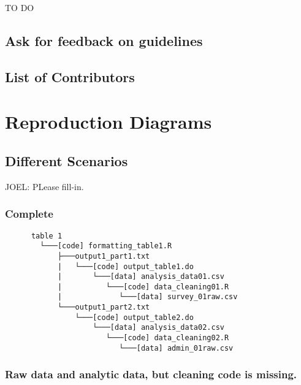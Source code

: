 \documentclass[]{book}
\begin{document}
TO DO

\hypertarget{ask-for-feedback-on-guidelines}{%
\section{Ask for feedback on guidelines}\label{ask-for-feedback-on-guidelines}}

\hypertarget{list-of-contributors}{%
\section{List of Contributors}\label{list-of-contributors}}

\hypertarget{reproduction-diagrams}{%
\chapter{Reproduction Diagrams}\label{reproduction-diagrams}}

\hypertarget{different-scenarios}{%
\section{Different Scenarios}\label{different-scenarios}}

JOEL: PLease fill-in.

\hypertarget{complete}{%
\subsection{Complete}\label{complete}}

\begin{verbatim}
      table 1
        └───[code] formatting_table1.R
            ├───output1_part1.txt  
            |   └───[code] output_table1.do           
            |       └───[data] analysis_data01.csv
            |          └───[code] data_cleaning01.R
            |             └───[data] survey_01raw.csv
            └───output1_part2.txt  
                └───[code] output_table2.do           
                    └───[data] analysis_data02.csv
                       └───[code] data_cleaning02.R
                          └───[data] admin_01raw.csv  
\end{verbatim}

\hypertarget{raw-data-and-analytic-data-but-cleaning-code-is-missing.}{%
\subsection{Raw data and analytic data, but cleaning code is missing.}\label{raw-data-and-analytic-data-but-cleaning-code-is-missing.}}
\end{document}
